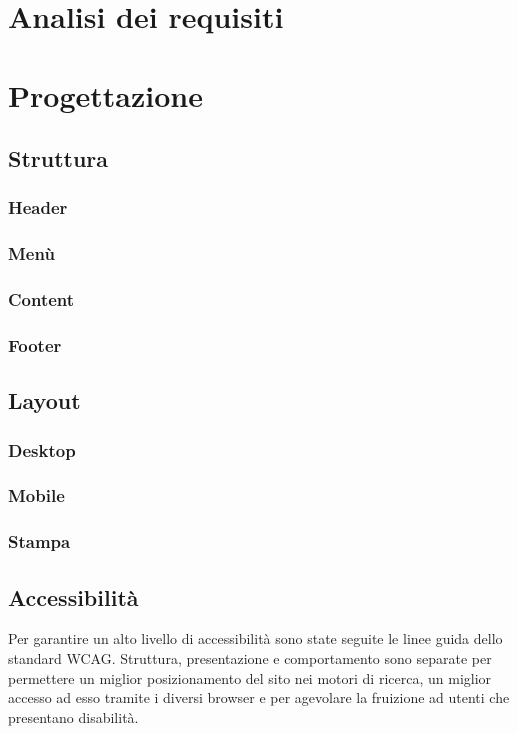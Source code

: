 \documentclass[12pt,a4paper,headings=optiontohead]{article}
\begin{document}
\section{Analisi dei requisiti}


\section{Progettazione}
\subsection{Struttura}
\subsubsection{Header}
\subsubsection{Menù}
\subsubsection{Content}
\subsubsection{Footer}

\subsection{Layout}
\subsubsection{Desktop}
\subsubsection{Mobile}
\subsubsection{Stampa}

\subsection{Accessibilità}
Per garantire un alto livello di accessibilità sono state seguite le linee guida dello standard WCAG. Struttura, presentazione e comportamento sono separate per permettere un miglior posizionamento del sito nei motori di ricerca, un miglior accesso ad esso tramite i diversi browser e per agevolare la fruizione ad utenti che presentano disabilità.
\end{document}
